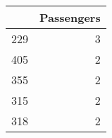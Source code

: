 \begin{tabular}{lr}
\toprule
{} &  Passengers \\
\midrule
229 &           3 \\
405 &           2 \\
355 &           2 \\
315 &           2 \\
318 &           2 \\
\bottomrule
\end{tabular}
